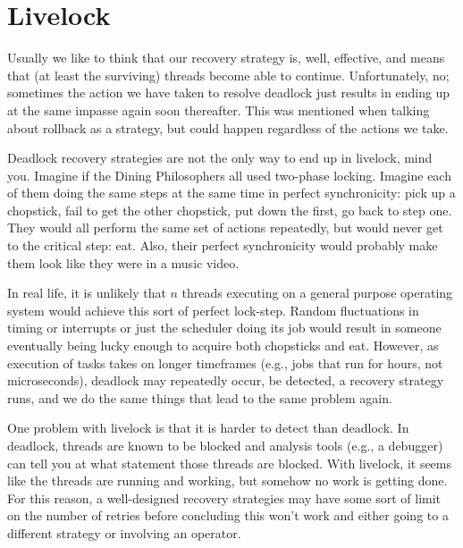 \section*{Livelock}

Usually we like to think that our recovery strategy is, well, effective, and means that (at least the surviving) threads become able to continue. Unfortunately, no; sometimes the action we have taken to resolve deadlock just results in ending up at the same impasse again soon thereafter. This was mentioned when talking about rollback as a strategy, but could happen regardless of the actions we take.

Deadlock recovery strategies are not the only way to end up in livelock, mind you. Imagine if the Dining Philosophers all used two-phase locking. Imagine each of them doing the same steps at the same time in perfect synchronicity: pick up a chopstick, fail to get the other chopstick, put down the first, go back to step one. They would all perform the same set of actions repeatedly, but would never get to the critical step: eat. Also, their perfect synchronicity would probably make them look like they were in a music video.

In real life, it is unlikely that $n$ threads executing on a general purpose operating system would achieve this sort of perfect lock-step. Random fluctuations in timing or interrupts or just the scheduler doing its job would result in someone eventually being lucky enough to acquire both chopsticks and eat. However, as execution of tasks takes on longer timeframes (e.g., jobs that run for hours, not microseconds), deadlock may repeatedly occur, be detected, a recovery strategy runs, and we do the same things that lead to the same problem again. 

One problem with livelock is that it is harder to detect than deadlock. In deadlock, threads are known to be blocked and analysis tools (e.g., a debugger) can tell you at what statement those threads are blocked. With livelock, it seems like the threads are running and working, but somehow no work is getting done. For this reason, a well-designed recovery strategies may have some sort of limit on the number of retries before concluding this won't work and either going to a different strategy or involving an operator.




